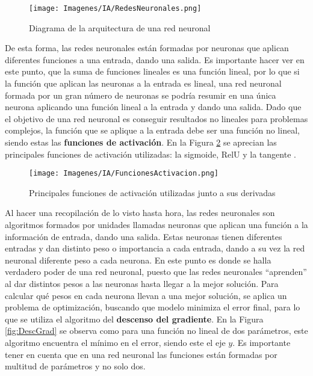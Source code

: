 \documentclass{report}
\begin{document}
\vspace{0.4cm}
\begin{figure}[H]
    \centering
    \texttt{[image: Imagenes/IA/RedesNeuronales.png]}
    \caption{ Diagrama de la arquitectura de una red neuronal }
    \label{fig:RedNeuronal}
\end{figure}
\vspace{0.4cm}


De esta forma, las redes neuronales están formadas por neuronas que aplican diferentes funciones a una entrada, dando una salida. Es importante hacer ver en este punto, que la suma de funciones lineales es una función lineal, por lo que si la función que aplican las neuronas a la entrada es lineal, una red neuronal formada por un gran número de neuronas se podría resumir en una única neurona aplicando una función lineal a la entrada y dando una salida. Dado que el objetivo de una red neuronal es conseguir resultados no lineales para problemas complejos, la función que se aplique a la entrada debe ser una función no lineal, siendo estas las \textbf{funciones de activación}. En la Figura \ref{fig:FuncActiv} se aprecian las principales funciones de activación utilizadas: la sigmoide, RelU y la tangente \cite{ArticuloBackpropagationReglaCdena}.


\vspace{0.4cm}
\begin{figure}[H]
    \centering
    \texttt{[image: Imagenes/IA/FuncionesActivacion.png]}
    \caption{ Principales funciones de activación utilizadas junto a sus derivadas \cite{ArticuloBackpropagationReglaCdena}}
    \label{fig:FuncActiv}
\end{figure}
\vspace{0.4cm}


Al hacer una recopilación de lo visto hasta hora, las redes neuronales son algoritmos formados por unidades llamadas neuronas que aplican una función a la información de entrada, dando una salida. Estas neuronas tienen diferentes entradas y dan distinto peso o importancia a cada entrada, dando a su vez la red neuronal diferente peso a cada neurona. En este punto es donde se halla verdadero poder de una red neuronal, puesto que las redes neuronales ``aprenden'' al dar distintos pesos a las neuronas hasta llegar a la mejor solución. Para calcular qué pesos en cada neurona llevan a una mejor solución, se aplica un problema de optimización, buscando que modelo minimiza el error final, para lo que se utiliza el algoritmo del \textbf{descenso del gradiente}. En la Figura \ref{fig:DescGrad} se observa como para una función no lineal de dos parámetros, este algoritmo encuentra el mínimo en el error, siendo este el eje $y$. Es importante tener en cuenta que en una red neuronal las funciones están formadas por multitud de parámetros y no solo dos.
\end{document}

